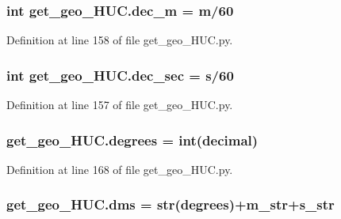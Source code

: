 \subsubsection[{\texorpdfstring{dec\+\_\+m}{dec_m}}]{\setlength{\rightskip}{0pt plus 5cm}int get\+\_\+geo\+\_\+\+H\+U\+C.\+dec\+\_\+m = m/60}\hypertarget{namespaceget__geo___h_u_c_a1cfdb988f3eb1e0c20b5d08ce96d901d}{}\label{namespaceget__geo___h_u_c_a1cfdb988f3eb1e0c20b5d08ce96d901d}


Definition at line 158 of file get\+\_\+geo\+\_\+\+H\+U\+C.\+py.

\subsubsection[{\texorpdfstring{dec\+\_\+sec}{dec_sec}}]{\setlength{\rightskip}{0pt plus 5cm}int get\+\_\+geo\+\_\+\+H\+U\+C.\+dec\+\_\+sec = s/60}\hypertarget{namespaceget__geo___h_u_c_aa6c84e39c9fc06d8d30722ddc165d320}{}\label{namespaceget__geo___h_u_c_aa6c84e39c9fc06d8d30722ddc165d320}


Definition at line 157 of file get\+\_\+geo\+\_\+\+H\+U\+C.\+py.

\subsubsection[{\texorpdfstring{degrees}{degrees}}]{\setlength{\rightskip}{0pt plus 5cm}get\+\_\+geo\+\_\+\+H\+U\+C.\+degrees = int(decimal)}\hypertarget{namespaceget__geo___h_u_c_adb089a41ce48669080941422b65583fc}{}\label{namespaceget__geo___h_u_c_adb089a41ce48669080941422b65583fc}


Definition at line 168 of file get\+\_\+geo\+\_\+\+H\+U\+C.\+py.

\subsubsection[{\texorpdfstring{dms}{dms}}]{\setlength{\rightskip}{0pt plus 5cm}get\+\_\+geo\+\_\+\+H\+U\+C.\+dms = str({\bf degrees})+{\bf m\+\_\+str}+{\bf s\+\_\+str}}\hypertarget{namespaceget__geo___h_u_c_ab1c89ec30aacba4c19305db584b1da12}{}\label{namespaceget__geo___h_u_c_ab1c89ec30aacba4c19305db584b1da12}


